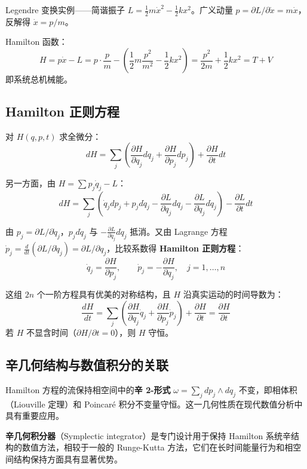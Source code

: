 \begin{example}{Legendre 变换实例——简谐振子}
	$L = \frac{1}{2}m\dot{x}^2 - \frac{1}{2}kx^2$。广义动量 $p = \partial L / \partial \dot{x} = m\dot{x}$，反解得 $\dot{x} = p / m$。
	
	Hamilton 函数：
	\[
	H = p\dot{x} - L = p \cdot \frac{p}{m} - \left( \frac{1}{2}m\frac{p^2}{m^2} - \frac{1}{2}kx^2 \right) = \frac{p^2}{2m} + \frac{1}{2}kx^2 = T + V
	\]
	即系统总机械能。
\end{example}

\subsection{Hamilton 正则方程}

对 $H(q, p, t)$ 求全微分：
\[
dH = \sum_{j} \left( \frac{\partial H}{\partial q_j} dq_j + \frac{\partial H}{\partial p_j} dp_j \right) + \frac{\partial H}{\partial t} dt
\]

另一方面，由 $H = \sum p_j \dot{q}_j - L$：
\[
dH = \sum_j \left( \dot{q}_j dp_j + p_j d\dot{q}_j - \frac{\partial L}{\partial q_j} dq_j - \frac{\partial L}{\partial \dot{q}_j} d\dot{q}_j \right) - \frac{\partial L}{\partial t} dt
\]

由 $p_j = \partial L / \partial \dot{q}_j$，$p_j d\dot{q}_j$ 与 $-\frac{\partial L}{\partial \dot{q}_j} d\dot{q}_j$ 抵消。又由 Lagrange 方程 $\dot{p}_j = \frac{d}{dt}(\partial L/\partial \dot{q}_j) = \partial L/\partial q_j$，比较系数得 \textbf{Hamilton 正则方程}：
\[
\boxed{\dot{q}_j = \frac{\partial H}{\partial p_j}, \qquad \dot{p}_j = -\frac{\partial H}{\partial q_j}}, \quad j = 1, \ldots, n
\]

这组 $2n$ 个一阶方程具有优美的对称结构，且 $H$ 沿真实运动的时间导数为：
\[
\frac{dH}{dt} = \sum_j \left( \frac{\partial H}{\partial q_j} \dot{q}_j + \frac{\partial H}{\partial p_j} \dot{p}_j \right) + \frac{\partial H}{\partial t} = \frac{\partial H}{\partial t}
\]
若 $H$ 不显含时间（$\partial H / \partial t = 0$），则 $H$ 守恒。

\subsection{辛几何结构与数值积分的关联}

Hamilton 方程的流保持相空间中的\textbf{辛 2-形式} $\omega = \sum_j dp_j \wedge dq_j$ 不变，即相体积（Liouville 定理）和 Poincar\'{e} 积分不变量守恒。这一几何性质在现代数值分析中具有重要应用。

\textbf{辛几何积分器}（Symplectic integrator）是专门设计用于保持 Hamilton 系统辛结构的数值方法，相较于一般的 Runge-Kutta 方法，它们在长时间能量行为和相空间结构保持方面具有显著优势。

